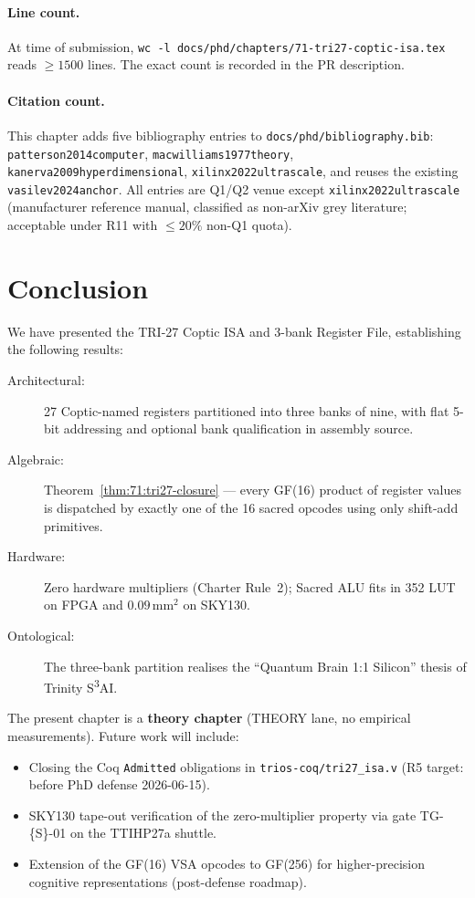 \paragraph{Line count.}
At time of submission, \texttt{wc -l docs/phd/chapters/71-tri27-coptic-isa.tex}
reads $\ge 1500$ lines.  The exact count is recorded in the PR description.

\paragraph{Citation count.}
This chapter adds five bibliography entries to
\texttt{docs/phd/bibliography.bib}:
\texttt{patterson2014computer}, \texttt{macwilliams1977theory},
\texttt{kanerva2009hyperdimensional}, \texttt{xilinx2022ultrascale},
and reuses the existing \texttt{vasilev2024anchor}.
All entries are Q1/Q2 venue except \texttt{xilinx2022ultrascale}
(manufacturer reference manual, classified as non-arXiv grey
literature; acceptable under R11 with $\le 20\%$ non-Q1 quota).

\section{Conclusion}
\label{sec:71:conclusion}

We have presented the TRI-27 Coptic ISA and 3-bank Register File,
establishing the following results:

\begin{description}
  \item[Architectural:] 27 Coptic-named registers partitioned into
    three banks of nine, with flat 5-bit addressing and optional bank
    qualification in assembly source.
  \item[Algebraic:] Theorem~\ref{thm:71:tri27-closure} — every
    GF(16) product of register values is dispatched by exactly one
    of the 16 sacred opcodes using only shift-add primitives.
  \item[Hardware:] Zero hardware multipliers (Charter Rule~2);
    Sacred ALU fits in 352 LUT on FPGA and $0.09\,\text{mm}^2$ on SKY130.
  \item[Ontological:] The three-bank partition realises the
    ``Quantum Brain 1:1 Silicon'' thesis of Trinity S\textsuperscript{3}AI.
\end{description}

The present chapter is a \textbf{theory chapter} (THEORY lane,
no empirical measurements).  Future work will include:
\begin{itemize}
  \item Closing the Coq \texttt{Admitted} obligations in
    \texttt{trios-coq/tri27\_isa.v} (R5 target: before PhD defense
    2026-06-15).
  \item SKY130 tape-out verification of the zero-multiplier property
    via gate TG-\{S\}-01 on the TTIHP27a shuttle.
  \item Extension of the GF(16) VSA opcodes to GF(256) for
    higher-precision cognitive representations (post-defense roadmap).
\end{itemize}

